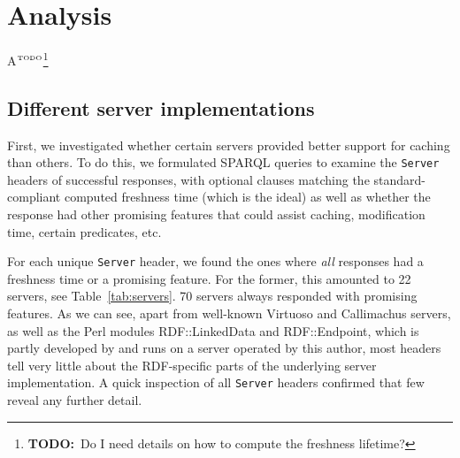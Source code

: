 \documentclass{llncs}
\newcommand{\httph}[1]{\texttt{#1}}
\newcommand{\todo}[1]{\ensuremath{^{\textrm{\tiny{TODO}\normalsize}}}\footnote{\textbf{TODO:}~#1}}
\begin{document}
\section{Analysis}

A\todo{Do I need details on how to compute the freshness lifetime?}

\subsection{Different server implementations}

First, we investigated whether certain servers provided better support
for caching than others. To do this, we formulated SPARQL queries to
examine the \httph{Server} headers of successful responses, with
optional clauses matching the standard-compliant computed freshness
time (which is the ideal) as well as whether the response had other
promising features that could assist caching, modification time,
certain predicates, etc.

For each unique \httph{Server} header, we found the ones where
\emph{all} responses had a freshness time or a promising feature. For
the former, this amounted to 22 servers, see 
Table~\ref{tab:servers}. 70 servers always responded with promising
features. As we can see, apart from well-known Virtuoso and
Callimachus servers, as well as the Perl modules RDF::LinkedData and
RDF::Endpoint, which is partly developed by and runs on a server
operated by this author, most headers tell very little about the
RDF-specific parts of the underlying server implementation. A quick
inspection of all \httph{Server} headers confirmed that few reveal any
further detail.
\end{document}
